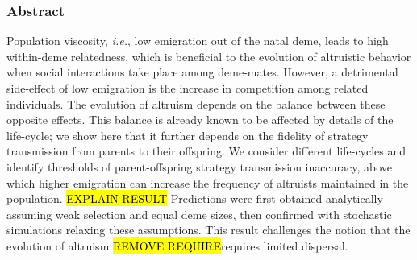 \documentclass[11pt, letterpaper]{article}
\newcommand{\ie}{\textit{i.e.}}
\begin{document}

\linenumbers
\subsubsection*{Abstract}
\doublespacing
Population viscosity, \ie, low emigration out of the natal deme, leads to high within-deme relatedness, which is beneficial to the evolution of altruistic behavior when social interactions take place among deme-mates. However, a detrimental side-effect of low emigration is the increase in competition among related individuals. The evolution of altruism depends on the balance between these opposite effects. This balance is already known to be affected by details of the life-cycle; we show here that it further depends on the fidelity of strategy transmission from parents to their offspring. We consider different life-cycles and identify thresholds of parent-offspring strategy transmission inaccuracy, above which higher emigration can increase the frequency of altruists maintained in the population. \hl{EXPLAIN RESULT} Predictions were first obtained analytically assuming weak selection and equal deme sizes, then confirmed with stochastic simulations relaxing these assumptions. This result challenges the notion that the evolution of altruism \hl{REMOVE REQUIRE}requires limited dispersal. 

\clearpage
\end{document}
